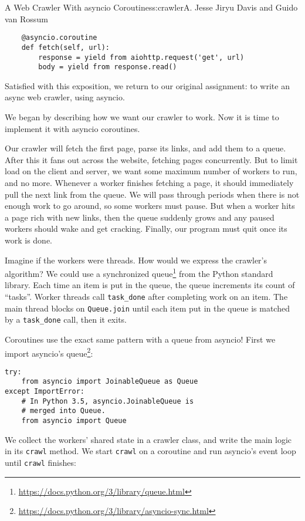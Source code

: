 \begin{aosachapter}{A Web Crawler With asyncio Coroutines}{s:crawler}{A. Jesse Jiryu Davis and Guido van Rossum}
\begin{verbatim}
    @asyncio.coroutine
    def fetch(self, url):
        response = yield from aiohttp.request('get', url)
        body = yield from response.read()
\end{verbatim}

Satisfied with this exposition, we return to our original assignment: to
write an async web crawler, using asyncio.

\label{coordinating-coroutines}

We began by describing how we want our crawler to work. Now it is time
to implement it with asyncio coroutines.

Our crawler will fetch the first page, parse its links, and add them to
a queue. After this it fans out across the website, fetching pages
concurrently. But to limit load on the client and server, we want some
maximum number of workers to run, and no more. Whenever a worker
finishes fetching a page, it should immediately pull the next link from
the queue. We will pass through periods when there is not enough work to
go around, so some workers must pause. But when a worker hits a page
rich with new links, then the queue suddenly grows and any paused
workers should wake and get cracking. Finally, our program must quit
once its work is done.

Imagine if the workers were threads. How would we express the crawler's
algorithm? We could use a synchronized queue\footnote{\url{https://docs.python.org/3/library/queue.html}}
from the Python standard library. Each time an item is put in the queue,
the queue increments its count of ``tasks''. Worker threads call
\texttt{task\_done} after completing work on an item. The main thread
blocks on \texttt{Queue.join} until each item put in the queue is
matched by a \texttt{task\_done} call, then it exits.

Coroutines use the exact same pattern with a queue from asyncio! First
we import asyncio's queue\footnote{\url{https://docs.python.org/3/library/asyncio-sync.html}}:

\begin{verbatim}
try:
    from asyncio import JoinableQueue as Queue
except ImportError:
    # In Python 3.5, asyncio.JoinableQueue is
    # merged into Queue.
    from asyncio import Queue
\end{verbatim}

We collect the workers' shared state in a crawler class, and write the
main logic in its \texttt{crawl} method. We start \texttt{crawl} on a
coroutine and run asyncio's event loop until \texttt{crawl} finishes:


\end{aosachapter}
